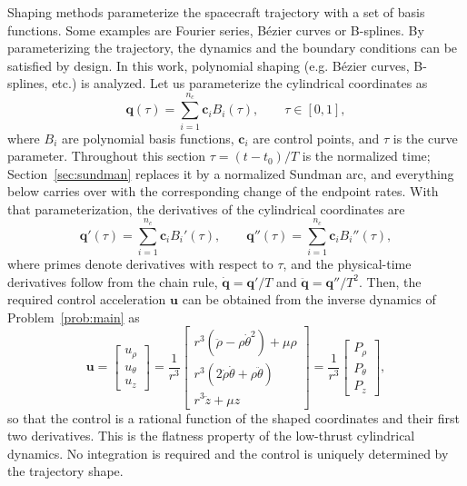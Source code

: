 \documentclass[a4paper,fleqn]{cas-sc}
\begin{document}
Shaping methods parameterize the spacecraft trajectory with a set of basis
functions. Some examples are Fourier series, B\'ezier curves or B-splines. By
parameterizing the trajectory, the dynamics and the boundary conditions can be
satisfied by design. In this work, polynomial shaping (e.g. B\'ezier curves,
B-splines, etc.) is analyzed. Let us parameterize the cylindrical coordinates as
\begin{equation}
	\mathbf{q}(\tau)=\sum^{n_c}_{i=1}\mathbf{c}_i B_i(\tau),\qquad\tau\in[0,1],
	\label{eq:shaping}
\end{equation}
where $B_i$ are polynomial basis functions, $\mathbf{c}_i$ are control points,
and $\tau$ is the curve parameter. Throughout this section $\tau=(t-t_0)/T$ is
the normalized time; Section~\ref{sec:sundman} replaces it by a normalized
Sundman arc, and everything below carries over with the corresponding
change of the endpoint rates. With that parameterization, the derivatives of the
cylindrical coordinates are
\begin{equation}
	\mathbf{q}'(\tau)=\sum^{n_c}_{i=1}\mathbf{c}_i B_i'(\tau),\quad\quad
	\mathbf{q}''(\tau)=\sum^{n_c}_{i=1}\mathbf{c}_i B_i''(\tau),
\end{equation}
where primes denote derivatives with respect to $\tau$, and the physical-time
derivatives follow from the chain rule,
$\dot{\mathbf q}=\mathbf q'/T$ and $\ddot{\mathbf q}=\mathbf q''/T^2$. Then,
the required control acceleration $\mathbf{u}$ can be obtained from the inverse dynamics of
Problem~\eqref{prob:main} as
\begin{equation}
	\mathbf{u}
	=
	\begin{bmatrix}
		u_\rho\\
		u_\theta\\
		u_z
	\end{bmatrix}
	=
	\dfrac{1}{r^3}\begin{bmatrix}
		r^3(\ddot{\rho}-\rho\dot{\theta}^{2})+\mu\rho\\[1mm]
		r^3(2\dot{\rho}\dot{\theta}+\rho\ddot{\theta})\\[1mm]
		r^3\ddot{z}+\mu z
	\end{bmatrix}=\dfrac{1}{r^3}
	\begin{bmatrix}
		P_\rho\\[1mm]
		P_\theta\\[1mm]
		P_z
	\end{bmatrix},
	\label{eq:flatness2}
\end{equation}
so that the control is a rational function of the shaped coordinates and
their first two derivatives. This is the flatness property of the low-thrust cylindrical
dynamics. No integration is required and the control is uniquely determined by
the trajectory shape.
\end{document}
